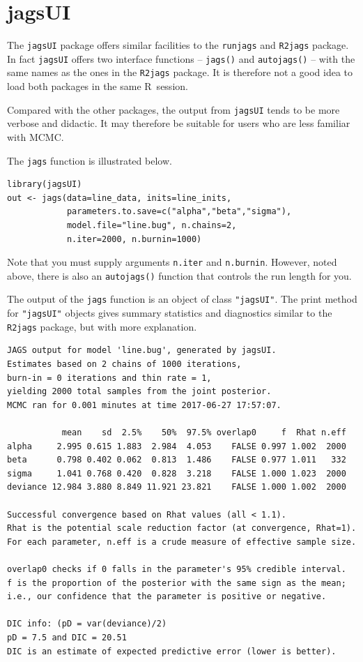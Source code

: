 \documentclass[11pt, a4paper, titlepage]{report}
\newcommand{\R}{\textsf{R}}
\begin{document}
\section{jagsUI}
\label{section:R:jagsUI}

The \texttt{jagsUI} package offers similar facilities to the
\texttt{runjags} and \texttt{R2jags} package. In fact \texttt{jagsUI}
offers two interface functions -- \texttt{jags()} and
\texttt{autojags()} -- with the same names as the ones in the
\texttt{R2jags} package. It is therefore not a good idea to load both
packages in the same \R\ session.

Compared with the other packages, the output from \texttt{jagsUI}
tends to be more verbose and didactic. It may therefore be suitable
for users who are less familiar with MCMC.

The \texttt{jags} function is illustrated below.
\begin{verbatim}
library(jagsUI)
out <- jags(data=line_data, inits=line_inits,
            parameters.to.save=c("alpha","beta","sigma"),
            model.file="line.bug", n.chains=2,
            n.iter=2000, n.burnin=1000)
\end{verbatim}
Note that you must supply arguments \texttt{n.iter} and
\texttt{n.burnin}. However, noted above, there is also an
\texttt{autojags()} function that controls the run length for you.

The output of the \texttt{jags} function is an object of class
\texttt{"jagsUI"}.  The print method for \texttt{"jagsUI"} objects
gives summary statistics and diagnostics similar to the
\texttt{R2jags} package, but with more explanation.
\begin{verbatim}
JAGS output for model 'line.bug', generated by jagsUI.
Estimates based on 2 chains of 1000 iterations,
burn-in = 0 iterations and thin rate = 1,
yielding 2000 total samples from the joint posterior. 
MCMC ran for 0.001 minutes at time 2017-06-27 17:57:07.

           mean    sd  2.5%    50%  97.5% overlap0     f  Rhat n.eff
alpha     2.995 0.615 1.883  2.984  4.053    FALSE 0.997 1.002  2000
beta      0.798 0.402 0.062  0.813  1.486    FALSE 0.977 1.011   332
sigma     1.041 0.768 0.420  0.828  3.218    FALSE 1.000 1.023  2000
deviance 12.984 3.880 8.849 11.921 23.821    FALSE 1.000 1.002  2000

Successful convergence based on Rhat values (all < 1.1). 
Rhat is the potential scale reduction factor (at convergence, Rhat=1). 
For each parameter, n.eff is a crude measure of effective sample size. 

overlap0 checks if 0 falls in the parameter's 95% credible interval.
f is the proportion of the posterior with the same sign as the mean;
i.e., our confidence that the parameter is positive or negative.

DIC info: (pD = var(deviance)/2) 
pD = 7.5 and DIC = 20.51 
DIC is an estimate of expected predictive error (lower is better).
\end{verbatim}
\end{document}
